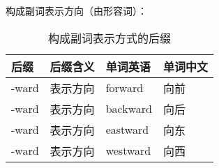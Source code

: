 \documentclass[UTF8]{ctexart}
\begin{document}
    构成副词表示方向（由形容词）：
    \begin{table}[h!]
        \begin{center}
            \ttfamily
            \begin{tabular}{p{40pt}|p{80pt}|p{80pt}|p{80pt}}
                \hline
                后缀&后缀含义&单词英语&单词中文\\ \hline
                -ward&表示方向&forward&向前\\ \hline
                -ward&表示方向&backward&向后\\ \hline
                -ward&表示方向&eastward&向东\\ \hline
                -ward&表示方向&westward&向西\\ \hline
            \end{tabular}
            \rmfamily
            \caption{构成副词表示方式的后缀}
        \end{center}
    \end{table}\\

\newpage
\end{document}
